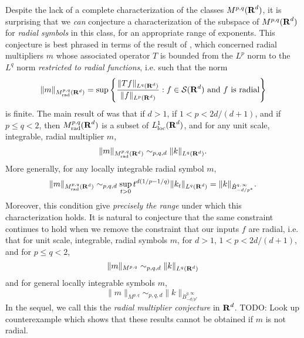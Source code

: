 Despite the lack of a complete characterization of the classes $M^{p,q}(\operatorname{\mathbf{R}}^d)$, it is surprising that we \emph{can} conjecture a characterization of the subspace of $M^{p,q}(\operatorname{\mathbf{R}}^d)$ for \emph{radial symbols} in this class, for an appropriate range of exponents. This conjecture is best phrased in terms of the result of \cite{GarrigosandSeeger}, which concerned radial multipliers $m$ whose associated operator $T$ is bounded from the $L^p$ norm to the $L^q$ norm \emph{restricted to radial functions}, i.e. such that the norm
%
\[ \| m \|_{M^{p,q}_{\text{rad}}(\operatorname{\mathbf{R}}^d)} = \sup \left\{ \frac{\| Tf \|_{L^q(\operatorname{\mathbf{R}}^d)}}{\| f \|_{L^p(\operatorname{\mathbf{R}}^d)}} : f \in \mathcal{S}(\operatorname{\mathbf{R}}^d)\ \text{and $f$ is radial} \right\} \]
%
is finite. The main result of \cite{GarrigosandSeeger} was that if $d > 1$, if $1 < p < 2d/(d+1)$, and if $p \leq q < 2$, then $M^{p,q}_{\text{rad}}(\operatorname{\mathbf{R}}^d)$ is a subset of $L^1_{\text{loc}}(\operatorname{\mathbf{R}}^d)$, and for any unit scale, integrable, radial multiplier $m$,
%
\[ \| m \|_{M^{p,q}_{\text{rad}}(\operatorname{\mathbf{R}}^d)} \sim_{p,q,d} \| k \|_{L^q(\operatorname{\mathbf{R}}^d)}. \]
%
More generally, for any locally integrable radial symbol $m$,
%
\[ \| m \|_{M^{p,q}_{\text{rad}}(\operatorname{\mathbf{R}}^d)} \sim_{p,q,d} \sup_{t > 0} t^{d(1/p - 1/q)} \| k_t \|_{L^q(\operatorname{\mathbf{R}}^d)} = \| k \|_{\dot{B}^{q,\infty}_{-d/p^*}}. \]
%
Moreover, this condition give \emph{precisely the range} under which this characterization holds. It is natural to conjecture that the same constraint continues to hold when we remove the constraint that our inputs $f$ are radial, i.e. that for unit scale, integrable, radial symbols $m$, for $d > 1$, $1 < p < 2d/(d+1)$, and for $p \leq q < 2$,
%
\[ \| m \|_{M^{p,q}} \sim_{p,q,d} \| k \|_{L^q(\operatorname{\mathbf{R}}^d)} \]
%
and for general locally integrable symbols $m$,
%
\[ \| m \|_{M^{p,q}} \sim_{p,q,d} \| k \|_{\dot{B}_{-d/p^*}^{q,\infty}} \]
%
In the sequel, we call this the \emph{radial multiplier conjecture} in $\operatorname{\mathbf{R}}^d$. TODO: Look up counterexample which shows that these results cannot be obtained if $m$ is not radial.

